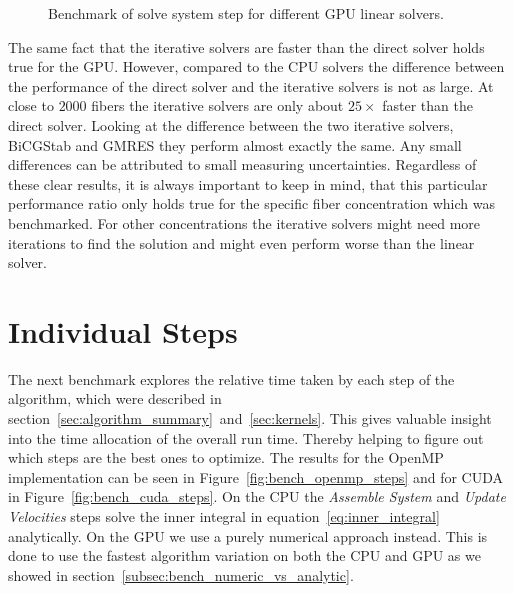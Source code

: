 \documentclass[a4paper,11pt]{kth-mag}
\begin{document}
\begin{figure}[!htbp]
  \centering
  \caption{Benchmark of solve system step for different GPU linear solvers.}
  \label{fig:bench_cuda_solvers}
\end{figure}

The same fact that the iterative solvers are faster than the direct solver holds true for the GPU. However, compared to the CPU solvers the difference between the performance of the direct solver and the iterative solvers is not as large. At close to $2000$ fibers the iterative solvers are only about $25×$ faster than the direct solver. Looking at the difference between the two iterative solvers, BiCGStab and GMRES they perform almost exactly the same. Any small differences can be attributed to small measuring uncertainties. Regardless of these clear results, it is always important to keep in mind, that this particular performance ratio only holds true for the specific fiber concentration which was benchmarked. For other concentrations the iterative solvers might need more iterations to find the solution and might even perform worse than the linear solver.

\section{Individual Steps}

The next benchmark explores the relative time taken by each step of the algorithm, which were described in section~\ref{sec:algorithm_summary}~and~\ref{sec:kernels}. This gives valuable insight into the time allocation of the overall run time. Thereby helping to figure out which steps are the best ones to optimize. The results for the OpenMP implementation can be seen in Figure~\ref{fig:bench_openmp_steps} and for CUDA in Figure~\ref{fig:bench_cuda_steps}. On the CPU the \emph{Assemble System} and \emph{Update Velocities} steps solve the inner integral in equation~\eqref{eq:inner_integral} analytically. On the GPU we use a purely numerical approach instead. This is done to use the fastest algorithm variation on both the CPU and GPU as we showed in section~\ref{subsec:bench_numeric_vs_analytic}.	
\end{document}
